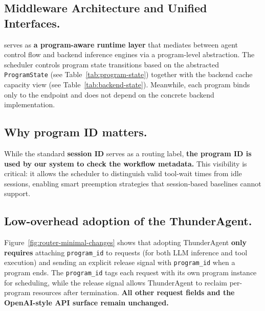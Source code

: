 \subsection{Middleware Architecture and Unified Interfaces.}
\noindent \ouralg serves as \textbf{a program-aware runtime layer} that mediates between agent control flow and backend inference engines via a program-level abstraction. The scheduler controls program state transitions based on the abstracted \texttt{ProgramState} (see Table~\ref{tab:program-state}) together with the backend cache capacity view (see Table~\ref{tab:backend-state}). Meanwhile, each program binds only to the endpoint and does not depend on the concrete backend implementation.

\subsection{Why program ID matters.}

While the standard \textbf{session ID} serves as a routing label, \textbf{the program ID is used by our system to check the workflow metadata.} This visibility is critical: it allows the scheduler to distinguish valid tool-wait times from idle sessions, enabling smart preemption strategies that session-based baselines cannot support.

\subsection{Low-overhead adoption of the ThunderAgent.}
Figure~\ref{fig:router-minimal-changes} shows that adopting ThunderAgent \textbf{only requires} attaching \texttt{program\_id} to requests (for both LLM inference and tool execution) and sending an explicit release signal with \texttt{program\_id} when a program ends.
The \texttt{program\_id} tags each request with its own program instance for scheduling, while the
release signal allows ThunderAgent to reclaim per-program resources after termination.
\textbf{All other request fields and the OpenAI-style API surface remain unchanged.}



